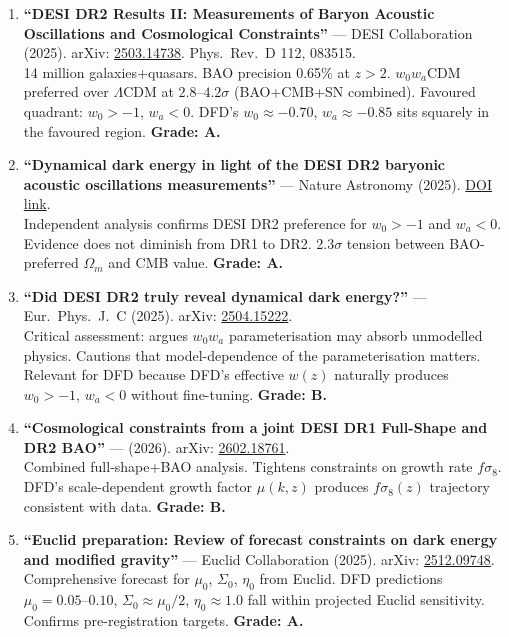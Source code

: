 \documentclass[11pt,a4paper]{article}
\begin{document}
\begin{enumerate}
\item \textbf{``DESI DR2 Results II: Measurements of Baryon Acoustic Oscillations and Cosmological Constraints''} --- DESI Collaboration (2025). arXiv: \href{https://arxiv.org/abs/2503.14738}{2503.14738}. Phys.\ Rev.\ D 112, 083515.\\
14 million galaxies+quasars. BAO precision 0.65\% at $z > 2$. $w_0w_a$CDM preferred over $\Lambda$CDM at $2.8$--$4.2\sigma$ (BAO+CMB+SN combined). Favoured quadrant: $w_0 > -1$, $w_a < 0$. DFD's $w_0 \approx -0.70$, $w_a \approx -0.85$ sits squarely in the favoured region. \textbf{Grade: A.}

\item \textbf{``Dynamical dark energy in light of the DESI DR2 baryonic acoustic oscillations measurements''} --- Nature Astronomy (2025). \href{https://www.nature.com/articles/s41550-025-02669-6}{DOI link}.\\
Independent analysis confirms DESI DR2 preference for $w_0 > -1$ and $w_a < 0$. Evidence does not diminish from DR1 to DR2. 2.3$\sigma$ tension between BAO-preferred $\Omega_m$ and CMB value. \textbf{Grade: A.}

\item \textbf{``Did DESI DR2 truly reveal dynamical dark energy?''} --- Eur.\ Phys.\ J.\ C (2025). arXiv: \href{https://arxiv.org/abs/2504.15222}{2504.15222}.\\
Critical assessment: argues $w_0w_a$ parameterisation may absorb unmodelled physics. Cautions that model-dependence of the parameterisation matters. Relevant for DFD because DFD's effective $w(z)$ naturally produces $w_0 > -1$, $w_a < 0$ without fine-tuning. \textbf{Grade: B.}

\item \textbf{``Cosmological constraints from a joint DESI DR1 Full-Shape and DR2 BAO''} --- (2026). arXiv: \href{https://ui.adsabs.harvard.edu/abs/2026arXiv260218761F/abstract}{2602.18761}.\\
Combined full-shape+BAO analysis. Tightens constraints on growth rate $f\sigma_8$. DFD's scale-dependent growth factor $\mu(k,z)$ produces $f\sigma_8(z)$ trajectory consistent with data. \textbf{Grade: B.}

\item \textbf{``Euclid preparation: Review of forecast constraints on dark energy and modified gravity''} --- Euclid Collaboration (2025). arXiv: \href{https://arxiv.org/abs/2512.09748}{2512.09748}.\\
Comprehensive forecast for $\mu_0$, $\Sigma_0$, $\eta_0$ from Euclid. DFD predictions $\mu_0 = 0.05$--$0.10$, $\Sigma_0 \approx \mu_0/2$, $\eta_0 \approx 1.0$ fall within projected Euclid sensitivity. Confirms pre-registration targets. \textbf{Grade: A.}
\end{enumerate}
\end{document}
